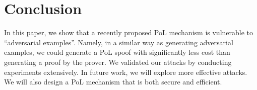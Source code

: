 \documentclass[conference]{IEEEtran}
\begin{document}
\section{Conclusion}
\label{sec:conc}

In this paper, we show that a recently proposed PoL mechanism is vulnerable to ``adversarial examples''.
Namely, in a similar way as generating adversarial examples, we could generate a PoL {spoof\EndAccSupp{}}  with significantly less cost than generating a proof by the prover.
We validated our attacks by conducting  {experiments\EndAccSupp{}} extensively. 
In future work, we will explore more effective attacks. 
We will also design a PoL mechanism that is both {secure\EndAccSupp{}} and efficient.




%
 



\end{document}

